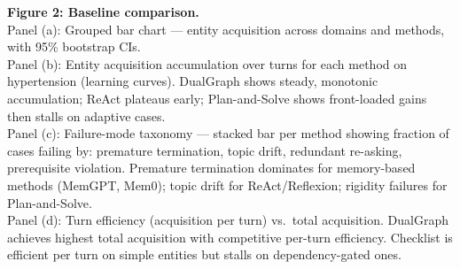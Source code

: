 \documentclass[11pt,a4paper]{article}
\newcommand{\placeholder}[1]{%
  \begin{tcolorbox}[colback=yellow!10,colframe=orange!60!black,
    fonttitle=\bfseries,title=Placeholder]
    #1
  \end{tcolorbox}%
}
\begin{document}
\begin{table}[!htbp]
\centering
\caption{DualGraph vs.\ agent baselines across four domains.
Entity acquisition rate (\%), information concordance (\%), and mean turns.
Best in bold; second-best underlined. All DualGraph values use the
static-graph variant; evolving-DAG results are reported separately in
Section~\ref{sec:results_evolving}.}
\label{tab:baselines}
\small

\end{table}

\placeholder{%
  \textbf{Figure 2: Baseline comparison.}\\
  Panel (a): Grouped bar chart --- entity acquisition across domains and
  methods, with 95\% bootstrap CIs.\\
  Panel (b): Entity acquisition accumulation over turns for each method on
  hypertension (learning curves). DualGraph shows steady, monotonic
  accumulation; ReAct plateaus early; Plan-and-Solve shows front-loaded
  gains then stalls on adaptive cases.\\
  Panel (c): Failure-mode taxonomy --- stacked bar per method showing
  fraction of cases failing by: premature termination, topic drift,
  redundant re-asking, prerequisite violation. Premature termination
  dominates for memory-based methods (MemGPT, Mem0); topic drift for
  ReAct/Reflexion; rigidity failures for Plan-and-Solve.\\
  Panel (d): Turn efficiency (acquisition per turn) vs.\ total acquisition.
  DualGraph achieves highest total acquisition with competitive per-turn
  efficiency. Checklist is efficient per turn on simple entities but stalls
  on dependency-gated ones.
}
\end{document}
